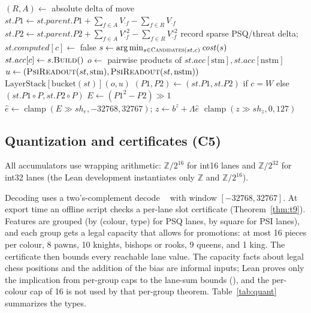 \documentclass[10pt]{article}
\newcommand{\lnm}[1]{\lean{VNNUE.#1}}
\newcommand{\Z}{\mathbb{Z}}
\newcommand{\Zm}[1]{\Z/2^{#1}}
\DeclareMathOperator{\dec}{dec_{16}}
\DeclareMathOperator{\clamp}{clamp}
\theoremstyle{plain}
\theoremstyle{definition}
\begin{document}
\begin{algorithm}[htbp]
\caption{VNNUE make/evaluate (specification pseudocode).}\label{alg:vnnue}
\begin{algorithmic}[1]
  \State $(R,A)\gets$ absolute delta of move 
  \State $st.P1\gets st.\mathit{parent}.P1+\sum_{f\in A}V_{\cdot f}-\sum_{f\in R}V_{\cdot f}$ 
  \State $st.P2\gets st.\mathit{parent}.P2+\sum_{f\in A}V^{\circ2}_{\cdot f}-\sum_{f\in R}V^{\circ2}_{\cdot f}$ 
   \State record sparse PSQ/threat delta; $st.\mathit{computed}[c]\gets$ false \EndFor
\EndProcedure
{}
    \State $s\gets\arg\min_{s\in\textsc{Candidates}(st,c)}\mathit{cost}(s)$ 
    \State $st.\mathit{acc}[c]\gets s.\textsc{Build}()$ 
  \EndFor
  \State $o\gets$ pairwise products of $st.\mathit{acc}[\mathrm{stm}],st.\mathit{acc}[\mathrm{nstm}]$ 
  \State $u\gets(\textsc{PsiReadout}(st,\mathrm{stm}),\textsc{PsiReadout}(st,\mathrm{nstm}))$
  \State \Return $\mathrm{LayerStack}[\mathrm{bucket}(st)](o,u)$
\EndProcedure
{}
  \State $(P1,P2)\gets(st.P1,st.P2)$ if $c=W$ else $(st.P1\circ P,st.P2\circ P)$ 
  \State $E\gets(P1^2-P2)\gg1$ 
  \State $\hat e\gets\clamp(E\gg\mathit{sh}_e,-32768,32767)$; $z\gets b^z+\Lambda\hat e$ 
  \State \Return $\clamp(z\gg\mathit{sh}_z,0,127)$
\EndProcedure
\end{algorithmic}
\end{algorithm}

\subsection{Quantization and certificates (C5)}

All accumulators use wrapping arithmetic: $\Zm{16}$ for int16 lanes and $\Zm{32}$ for int32 lanes (the Lean development instantiates only $\Z$ and $\Zm{16}$).

Decoding uses a two's-complement decode $\dec$ with window $[-32768,32767]$.
At export time an offline script checks a per-lane slot certificate (Theorem~\ref{thm:t9}).
Features are grouped (by (colour, type) for PSQ lanes, by square for PSI lanes), and each group gets a legal capacity that allows for promotions: at most 16 pieces per colour, 8 pawns, 10 knights, bishops or rooks, 9 queens, and 1 king.
The certificate then bounds every reachable lane value.
The capacity facts about legal chess positions and the addition of the bias are informal inputs; Lean proves only the implication from per-group caps to the lane-sum bounds (\lnm{slot_certificate}), and the per-colour cap of 16 is not used by that per-group theorem.
Table~\ref{tab:quant} summarizes the types.
\end{document}

